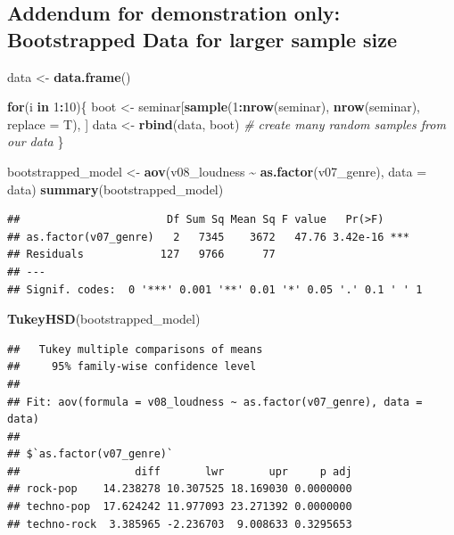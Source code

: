 \documentclass[
]{book}
\newenvironment{Shaded}{\begin{snugshade}}{\end{snugshade}}
\newcommand{\AttributeTok}[1]{\textcolor[rgb]{0.13,0.29,0.53}{#1}}
\newcommand{\CommentTok}[1]{\textcolor[rgb]{0.56,0.35,0.01}{\textit{#1}}}
\newcommand{\ControlFlowTok}[1]{\textcolor[rgb]{0.13,0.29,0.53}{\textbf{#1}}}
\newcommand{\DecValTok}[1]{\textcolor[rgb]{0.00,0.00,0.81}{#1}}
\newcommand{\FunctionTok}[1]{\textcolor[rgb]{0.13,0.29,0.53}{\textbf{#1}}}
\newcommand{\NormalTok}[1]{#1}
\newcommand{\OtherTok}[1]{\textcolor[rgb]{0.56,0.35,0.01}{#1}}
\newcommand{\SpecialCharTok}[1]{\textcolor[rgb]{0.81,0.36,0.00}{\textbf{#1}}}
\begin{document}
\subsection{Addendum for demonstration only: Bootstrapped Data for larger sample size}\label{addendum-for-demonstration-only-bootstrapped-data-for-larger-sample-size}

\begin{Shaded}
\begin{Highlighting}[]
\NormalTok{data }\OtherTok{\textless{}{-}} \FunctionTok{data.frame}\NormalTok{()}

\ControlFlowTok{for}\NormalTok{(i }\ControlFlowTok{in} \DecValTok{1}\SpecialCharTok{:}\DecValTok{10}\NormalTok{)\{}
\NormalTok{  boot }\OtherTok{\textless{}{-}}\NormalTok{ seminar[}\FunctionTok{sample}\NormalTok{(}\DecValTok{1}\SpecialCharTok{:}\FunctionTok{nrow}\NormalTok{(seminar), }\FunctionTok{nrow}\NormalTok{(seminar), }\AttributeTok{replace =}\NormalTok{ T), ]}
\NormalTok{  data }\OtherTok{\textless{}{-}} \FunctionTok{rbind}\NormalTok{(data, boot) }\CommentTok{\# create many random samples from our data }
\NormalTok{\}}

\NormalTok{bootstrapped\_model }\OtherTok{\textless{}{-}} \FunctionTok{aov}\NormalTok{(v08\_loudness }\SpecialCharTok{\textasciitilde{}} \FunctionTok{as.factor}\NormalTok{(v07\_genre), }\AttributeTok{data =}\NormalTok{ data)}
\FunctionTok{summary}\NormalTok{(bootstrapped\_model)}
\end{Highlighting}
\end{Shaded}

\begin{verbatim}
##                       Df Sum Sq Mean Sq F value   Pr(>F)    
## as.factor(v07_genre)   2   7345    3672   47.76 3.42e-16 ***
## Residuals            127   9766      77                     
## ---
## Signif. codes:  0 '***' 0.001 '**' 0.01 '*' 0.05 '.' 0.1 ' ' 1
\end{verbatim}

\begin{Shaded}
\begin{Highlighting}[]
\FunctionTok{TukeyHSD}\NormalTok{(bootstrapped\_model)}
\end{Highlighting}
\end{Shaded}

\begin{verbatim}
##   Tukey multiple comparisons of means
##     95% family-wise confidence level
## 
## Fit: aov(formula = v08_loudness ~ as.factor(v07_genre), data = data)
## 
## $`as.factor(v07_genre)`
##                  diff       lwr       upr     p adj
## rock-pop    14.238278 10.307525 18.169030 0.0000000
## techno-pop  17.624242 11.977093 23.271392 0.0000000
## techno-rock  3.385965 -2.236703  9.008633 0.3295653
\end{verbatim}
\end{document}
